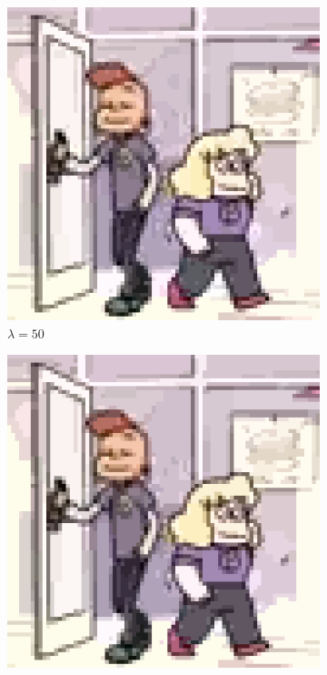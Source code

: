 \documentclass[10pt,twocolumn,letterpaper]{article}
\begin{document}
\begin{figure}
\centering
\begin{subfigure}{.48\linewidth}
\includegraphics[width=\linewidth]{alphaResults/sadylars_large_0050.png}
\caption{$\lambda = 50$}
\end{subfigure}
\begin{subfigure}{.48\linewidth}
\includegraphics[width=\linewidth]{alphaResults/sadylars_large_0100.png}

\end{subfigure}
\end{figure}
\end{document}
